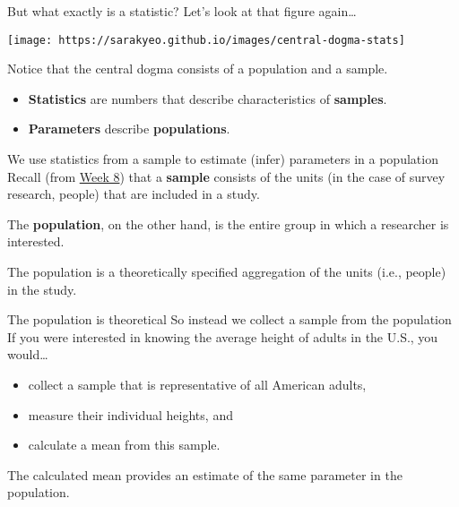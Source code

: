 \documentclass[
  ignorenonframetext,
]{beamer}
\providecommand{\tightlist}{%
  \setlength{\itemsep}{0pt}\setlength{\parskip}{0pt}}
\begin{document}
\begin{frame}{But what exactly is a statistic? \textbar{} Let's look at
that figure again\ldots{}}
\protect\hypertarget{but-what-exactly-is-a-statistic-lets-look-at-that-figure-again}{}
\begin{center}\texttt{[image: https://sarakyeo.github.io/images/central-dogma-stats]} \end{center}

Notice that the central dogma consists of a population and a sample.

\begin{itemize}[<+->]
\tightlist
\item
  \textbf{Statistics} are numbers that describe characteristics of
  \textbf{samples}.
\item
  \textbf{Parameters} describe \textbf{populations}.
\end{itemize}
\end{frame}

\begin{frame}{We use statistics from a sample to estimate (infer)
parameters in a population}
\protect\hypertarget{we-use-statistics-from-a-sample-to-estimate-infer-parameters-in-a-population}{}
Recall (from \href{https://sarakyeo.github.io/COMM-3710/week8.html}{Week
8}) that a \textbf{sample} consists of the units (in the case of survey
research, people) that are included in a study.

The \textbf{population}, on the other hand, is the entire group in which
a researcher is interested.

The population is a theoretically specified aggregation of the units
(i.e., people) in the study.
\end{frame}

\begin{frame}{The population is theoretical \textbar{} So instead we
collect a sample from the population}
\protect\hypertarget{the-population-is-theoretical-so-instead-we-collect-a-sample-from-the-population}{}
If you were interested in knowing the average height of adults in the
U.S., you would\ldots{}

\begin{itemize}
\tightlist
\item
  collect a sample that is representative of all American adults,
\item
  measure their individual heights, and
\item
  calculate a mean from this sample.
\end{itemize}

The calculated mean provides an estimate of the same parameter in the
population.
\end{frame}
\end{document}
